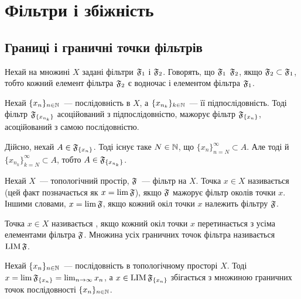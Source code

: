 \chapter{Фільтри і збіжність}

\section{Границі і граничні точки фільтрів}

\begin{definition}
    Нехай на множині $X$ задані фільтри $\frak F_1$ і $\frak F_2$. Говорять, що $\frak F_1$  $\frak F_2$, якщо $\frak F_2 \subset \frak F_1$, тобто кожний елемент фільтра $\frak F_2$ є водночас і елементом фільтра $\frak F_1$.
\end{definition}

\begin{example}
    Нехай $\{x_n\}_{n \in \NN}$~--- послідовність в $X$, а $\{x_{n_k}\}_{k \in \NN}$~--- її підпослідовність. Тоді фільтр $\frak F_{\{x_{n_k}\}}$ асоційований з підпослідовністю, мажорує фільтр $\frak F_{\{x_n\}}$, асоційований з самою послідовністю. 
    
    Дійсно, нехай $A \in \frak F_{\{x_n\}}$. Тоді існує таке $N \in \NN$, що $\{x_n\}_{n = N}^\infty \subset A$. Але тоді й $\{x_{n_k}\}_{k = N}^\infty \subset A$, тобто $A \in \frak F_{\{x_{n_k}\}}$.
\end{example}

\begin{definition}
    Нехай $X$~--- топологічний простір, $\frak F$~--- фільтр на $X$. Точка $x \in X$ називається  (цей факт позначається як $x = \lim \frak F$), якщо $\frak F$ мажорує фільтр околів точки $x$. Іншими словами, $x = \lim \frak F$, якщо кожний окіл точки $x$ належить фільтру $\frak F$.
\end{definition}

\begin{definition}
    Точка $x \in X$ називається , якщо кожний окіл точки $x$ перетинається з усіма елементами фільтра $\frak F$. Множина усіх граничних точок фільтра називається $\LIM \frak F$.
\end{definition}

\begin{example}
    Нехай $\{x_n\}_{n \in \NN}$~--- послідовність в топологічному просторі $X$. Тоді $x = \lim \frak F_{\{x_n\}} = \lim_{ n \to \infty} x_n$, а $x \in \LIM \frak F_{\{x_n\}}$ збігається з множиною граничних точок послідовності $\{x_n\}_{n \in \NN}$.
\end{example}

